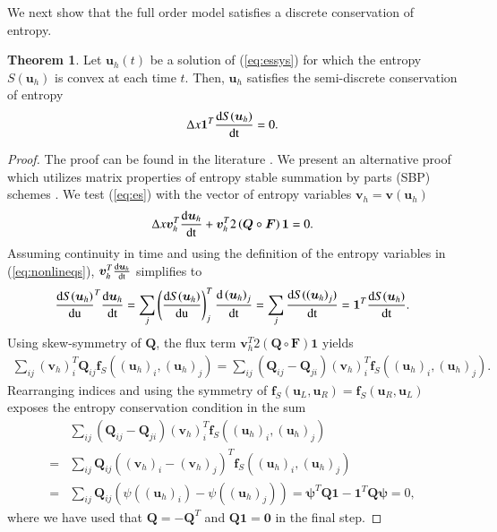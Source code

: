 \documentclass[preprint,10pt]{elsarticle}
\theoremstyle{definition}
\theoremstyle{lemma}
\theoremstyle{theorem}
\newtheorem{theorem}{Theorem}
\theoremstyle{assumption}
\newcommand{\td}[2]{\frac{{\rm d}#1}{{\rm d}{\rm #2}}}
\newcommand{\LRp}[1]{\left( #1 \right)}
\begin{document}
We next show that the full order model satisfies a discrete conservation of entropy.  
\begin{theorem}
\label{thm:ecfom}
Let $\bm{u}_h(t)$ be a solution of (\ref{eq:essys}) for which the entropy $S(\bm{u}_h)$ is convex at each time $t$.  Then, $\bm{u}_h$ satisfies the semi-discrete conservation of entropy 
\[
\Delta x \bm{1}^T\td{S(\bm{u}_h)}{t} = 0.
\]
\end{theorem}
\begin{proof}
The proof can be found in the literature \cite{tadmor1987numerical, tadmor2003entropy, tadmor2016entropy}.  We present an alternative proof which utilizes matrix properties of entropy stable summation by parts (SBP) schemes \cite{carpenter2014entropy, gassner2016split, chen2017entropy, crean2018entropy, chan2017discretely}.  We test (\ref{eq:es}) with the vector of entropy variables $\bm{v}_h = \bm{v}(\bm{u}_h)$
\[
\Delta x \bm{v}_h^T\td{\bm{u}_h}{t} + \bm{v}_h^T2\LRp{{\bm{Q}}\circ \bm{F}}\bm{1} = 0.
\]
Assuming continuity in time and using the definition of the entropy variables in (\ref{eq:nonlineqs}), $\bm{v}_h^T\td{\bm{u}_h}{t}$ simplifies to
\begin{align*}
{\td{S(\bm{u}_h)}{\bm{u}}}^T\td{\bm{u}_h}{t} = \sum_j \LRp{\td{S(\bm{u}_h)}{\bm{u}}}_j^T\td{\LRp{\bm{u}_h}_j}{t} =  \sum_j \td{S(\LRp{\bm{u}_h}_j)}{t}  =  \bm{1}^T\td{S(\bm{u}_h)}{t}.
\end{align*}
Using skew-symmetry of $\bm{Q}$, the flux term $\bm{v}_h^T2\LRp{{\bm{Q}}\circ \bm{F}}\bm{1}$ yields
\begin{align*}
\sum_{ij} \LRp{\bm{v}_h}_i^T \bm{Q}_{ij} \bm{f}_{S}\LRp{\LRp{\bm{u}_h}_i, \LRp{\bm{u}_h}_j} = \sum_{ij} \LRp{\bm{Q}_{ij}-\bm{Q}_{ji}} \LRp{\bm{v}_h}_i^T  \bm{f}_{S}\LRp{\LRp{\bm{u}_h}_i, \LRp{\bm{u}_h}_j}.
\end{align*}
Rearranging indices and using the symmetry of $\bm{f}_S(\bm{u}_L,\bm{u}_R) = \bm{f}_S(\bm{u}_R,\bm{u}_L)$ exposes the entropy conservation condition in the sum
\begin{align*}
&\sum_{ij} \LRp{\bm{Q}_{ij}-\bm{Q}_{ji}} \LRp{\bm{v}_h}_i^T \bm{f}_{S}\LRp{\LRp{\bm{u}_h}_i, \LRp{\bm{u}_h}_j} \\
=&\sum_{ij} \bm{Q}_{ij} \LRp{\LRp{\bm{v}_h}_i-\LRp{\bm{v}_h}_j}^T  \bm{f}_{S}\LRp{\LRp{\bm{u}_h}_i, \LRp{\bm{u}_h}_j}\\
=&\sum_{ij} \bm{Q}_{ij} \LRp{\psi\LRp{\LRp{\bm{u}_h}_i} - \psi(\LRp{\bm{u}_h}_j)} = \bm{\psi}^T\bm{Q}\bm{1}-\bm{1}^T\bm{Q}\bm{\psi} = 0,
\end{align*}
where we have used that $\bm{Q}=-\bm{Q}^T$ and $\bm{Q}\bm{1} = \bm{0}$ in the final step.

\end{proof}
\end{document}
